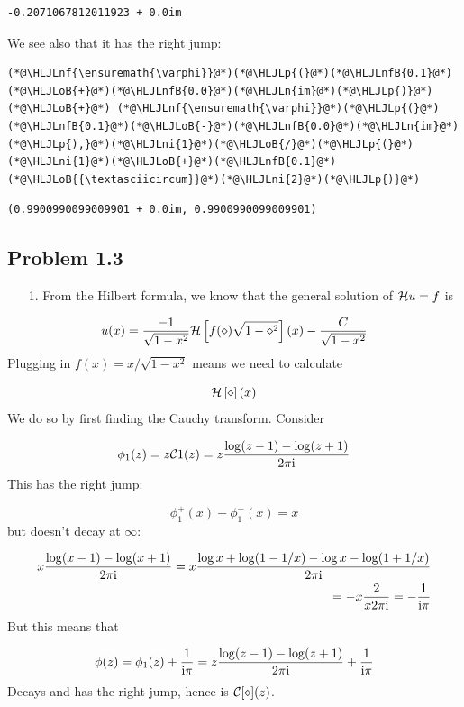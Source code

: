 \documentclass[12pt,a4paper]{article}
\newcommand{\HLJLn}[1]{#1}
\newcommand{\HLJLnf}[1]{\textcolor[RGB]{66,102,213}{#1}}
\newcommand{\HLJLnfB}[1]{\textcolor[RGB]{59,151,46}{#1}}
\newcommand{\HLJLni}[1]{\textcolor[RGB]{59,151,46}{#1}}
\newcommand{\HLJLoB}[1]{\textcolor[RGB]{102,102,102}{\textbf{#1}}}
\newcommand{\HLJLp}[1]{#1}
\def\I{ {\rm i} }
\def\CC{ {\cal C} }
\def\HH{ {\cal H} }
\begin{document}
\begin{lstlisting}
-0.2071067812011923 + 0.0im
\end{lstlisting}


We see also that it has the right jump:


\begin{lstlisting}
(*@\HLJLnf{\ensuremath{\varphi}}@*)(*@\HLJLp{(}@*)(*@\HLJLnfB{0.1}@*)(*@\HLJLoB{+}@*)(*@\HLJLnfB{0.0}@*)(*@\HLJLn{im}@*)(*@\HLJLp{)}@*) (*@\HLJLoB{+}@*) (*@\HLJLnf{\ensuremath{\varphi}}@*)(*@\HLJLp{(}@*)(*@\HLJLnfB{0.1}@*)(*@\HLJLoB{-}@*)(*@\HLJLnfB{0.0}@*)(*@\HLJLn{im}@*)(*@\HLJLp{),}@*)(*@\HLJLni{1}@*)(*@\HLJLoB{/}@*)(*@\HLJLp{(}@*)(*@\HLJLni{1}@*)(*@\HLJLoB{+}@*)(*@\HLJLnfB{0.1}@*)(*@\HLJLoB{{\textasciicircum}}@*)(*@\HLJLni{2}@*)(*@\HLJLp{)}@*)
\end{lstlisting}

\begin{lstlisting}
(0.9900990099009901 + 0.0im, 0.9900990099009901)
\end{lstlisting}


\subsection{Problem 1.3}
\begin{itemize}
\item[1. ] From the Hilbert formula, we know that the general solution of $\HH u = f$ is 

\end{itemize}
\[
    u(x) =  {-1 \over \sqrt{1 - x^2}}\HH \left[{ f(\diamond)  \sqrt{1-\diamond^2} }\right](x)  - {C \over \sqrt{1-x^2}}
\]
Plugging in $f(x) = x/\sqrt{1-x^2}$ means we need to calculate

\[
\HH \left[{\diamond}\right](x)
\]
We do so by first finding the Cauchy transform. Consider

\[
\phi_1(z) = z \CC 1(z) = z {\log(z-1) - \log(z+1) \over 2 \pi \I}
\]
This has the right jump:

\[
\phi_1^+(x) - \phi_1^-(x) = x
\]
but doesn't decay at $\infty$:


\begin{align*}
x {\log(x-1) - \log(x+1) \over 2 \pi \I} = x {\log x + \log(1-1/x) - \log x -\log(1+1/x) \over 2 \pi \I} \\
= -x { 2 \over x 2 \pi \I}  = -{1 \over \I \pi}
\end{align*}
But this means that

\[
\phi(z) = \phi_1(z) + {1 \over \I \pi} = z {\log(z-1) - \log(z+1) \over 2 \pi \I}  + {1 \over \I \pi}
\]
Decays and has the right jump, hence is $\CC[\diamond](z)$. 
\end{document}
